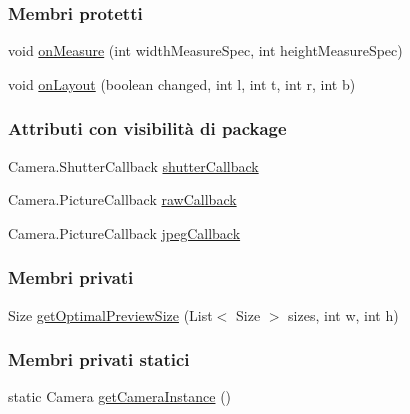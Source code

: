 \subsubsection*{Membri protetti}
\begin{DoxyCompactItemize}
\item 
void \hyperlink{classit_1_1unibo_1_1torsello_1_1bluetoothpositioning_1_1util_1_1CameraPreviewUtil_ad173ec9f318b978c9304482d432c8b21_ad173ec9f318b978c9304482d432c8b21}{on\+Measure} (int width\+Measure\+Spec, int height\+Measure\+Spec)
\item 
void \hyperlink{classit_1_1unibo_1_1torsello_1_1bluetoothpositioning_1_1util_1_1CameraPreviewUtil_a3b2897b27ca62e95df13f63d8d09e036_a3b2897b27ca62e95df13f63d8d09e036}{on\+Layout} (boolean changed, int l, int t, int r, int b)
\end{DoxyCompactItemize}
\subsubsection*{Attributi con visibilità di package}
\begin{DoxyCompactItemize}
\item 
Camera.\+Shutter\+Callback \hyperlink{classit_1_1unibo_1_1torsello_1_1bluetoothpositioning_1_1util_1_1CameraPreviewUtil_a146053288e01aa0d0ad482050182a1a4_a146053288e01aa0d0ad482050182a1a4}{shutter\+Callback}
\item 
Camera.\+Picture\+Callback \hyperlink{classit_1_1unibo_1_1torsello_1_1bluetoothpositioning_1_1util_1_1CameraPreviewUtil_a64b624b7bd81370fb4e80d3cb9226635_a64b624b7bd81370fb4e80d3cb9226635}{raw\+Callback}
\item 
Camera.\+Picture\+Callback \hyperlink{classit_1_1unibo_1_1torsello_1_1bluetoothpositioning_1_1util_1_1CameraPreviewUtil_aff50f9e425599097ed50d6d8341ed891_aff50f9e425599097ed50d6d8341ed891}{jpeg\+Callback}
\end{DoxyCompactItemize}
\subsubsection*{Membri privati}
\begin{DoxyCompactItemize}
\item 
Size \hyperlink{classit_1_1unibo_1_1torsello_1_1bluetoothpositioning_1_1util_1_1CameraPreviewUtil_ac7a729182a7e912d771f587f89a2ce03_ac7a729182a7e912d771f587f89a2ce03}{get\+Optimal\+Preview\+Size} (List$<$ Size $>$ sizes, int w, int h)
\end{DoxyCompactItemize}
\subsubsection*{Membri privati statici}
\begin{DoxyCompactItemize}
\item 
static Camera \hyperlink{classit_1_1unibo_1_1torsello_1_1bluetoothpositioning_1_1util_1_1CameraPreviewUtil_a7bfe209167872194f9237f51ece4cbf7_a7bfe209167872194f9237f51ece4cbf7}{get\+Camera\+Instance} ()
\end{DoxyCompactItemize}
